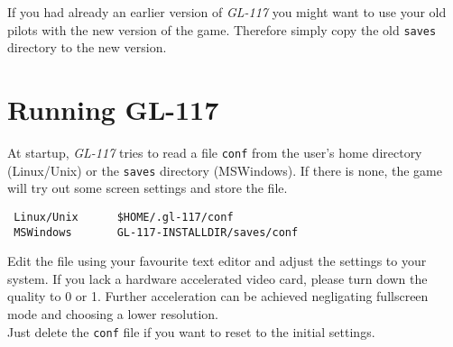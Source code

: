 If you had already an earlier version of \emph{GL-117} you might want to use your
old pilots with the new version of the game. Therefore simply copy the old
\texttt{saves} directory to the new version.


\section{Running GL-117}
\label{sec:running_gl117}

At startup, \emph{GL-117} tries to read a file \texttt{conf} from the user's home
directory (Linux/Unix) or the \texttt{saves} directory (MSWindows).
If there is none, the game will try out some screen settings and store the file.
\begin{verbatim}
 Linux/Unix      $HOME/.gl-117/conf
 MSWindows       GL-117-INSTALLDIR/saves/conf
\end{verbatim}

Edit the file using your favourite text editor and adjust the settings
to your system.
If you lack a hardware accelerated video card, please turn down the
quality to 0 or 1. Further acceleration can be achieved negligating fullscreen mode
and choosing a lower resolution.\\
Just delete the \texttt{conf} file if you want to reset to the initial settings.
